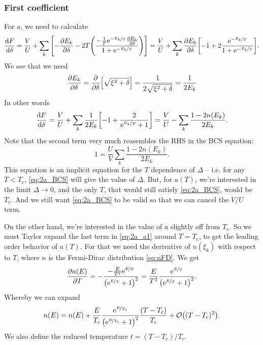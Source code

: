 \documentclass[11pt,letter, swedish, english
]{article}
\newcommand{\Tc}{\ensuremath{T_{\text{c}}}}
\begin{document}
\subsubsection{First coefficient}
For $a$, we need to calculate
\begin{equation}\label{eq:2a_dF/ddelta}
\dv{F}{\delta}=\frac{V}{U}
+\sum_k\qty[-\pdv{E_k}{\delta}
-2T\qty(\frac{-\frac{1}{T}\mathrm{e}^{-\nicefrac{E_k}{T}}\pdv{E_k}{\delta}}
{1+\mathrm{e}^{-\nicefrac{E_k}{T}}})]
=\frac{V}{U}
+\sum_k\pdv{E_k}{\delta}\qty[-1
+2\frac{\mathrm{e}^{-\nicefrac{E_k}{T}}}{1+\mathrm{e}^{-\nicefrac{E_k}{T}}}].
\end{equation}
We see that we need
\begin{equation}\label{eq:2a_dEk/ddelta}
\pdv{E_k}{\delta}=\pdv{\delta}\qty[\sqrt{\xi^2+\delta}]
=\frac{1}{2\sqrt{\xi^2+\delta}}=\frac{1}{2E_k}
\end{equation}
In other words
\begin{equation}\label{eq:2a_a1}
\dv{F}{\delta}
=\frac{V}{U}
+\sum_k\frac{1}{2E_k}\qty[-1
+\frac{2}{\mathrm{e}^{\nicefrac{E_k}{T}}+1}]
=\frac{V}{U}
-\sum_k\frac{1-2n(E_k)}{2E_k}.
\end{equation}
Note that the second term very much reasembles the RHS in the BCS
equation:
\begin{equation}\label{eq:2a_BCS}
1=\frac{U}{V}\sum_k\frac{1-2n(E_k)}{2E_k}.
\end{equation}
This equation is an implicit equation for the $T$ dependence of
$\Delta$ -- i.e. for any $T<\Tc$, \eqref{eq:2a_BCS} will give the value
of $\Delta$. But, for $a(T)$, we're interested in the limit $\Delta\to0$, and the
only $T$, that would still satisfy \eqref{eq:2a_BCS}, would be
$\Tc$. And we still want \eqref{eq:2a_BCS} to be valid so that we can
cancel the $V/U$ term.

On the other hand, we're interested in the value of $a$ slightly off
from $\Tc$. So we must Taylor expand 
the last term in \eqref{eq:2a_a1} around $T=\Tc$, to get the leading
order behavior of $a(T)$. For that we need the
derivative of $n(\xi_k)$ with respect to $T$, where $n$ is the
Fermi-Dirac distribution \eqref{eq:nFD}. We get
\begin{equation}
\pdv{n(E)}{T}=-\frac{-\frac{E}{T^2}\mathrm{e}^{\nicefrac{E}{T}}}{\qty(\mathrm{e}^{\nicefrac{E}{T}}+1)^2}
=\frac{E}{T^2}\frac{\mathrm{e}^{\nicefrac{E}{T}}}{\qty(\mathrm{e}^{\nicefrac{E}{T}}+1)^2}.
\end{equation}
Whereby we can expand
\begin{equation}
n(E)=n(E) %
+\frac{E}{\Tc}\frac{\ee^{\nicefrac{E}{\Tc}}}
{\qty(\ee^{\nicefrac{E}{\Tc}}+1)^2}
\frac{(T-\Tc)}{\Tc} + \order{(T-\Tc)^2}.
\end{equation}
We also define the reduced temperature $t=(T-\Tc)/\Tc$.
\end{document}
